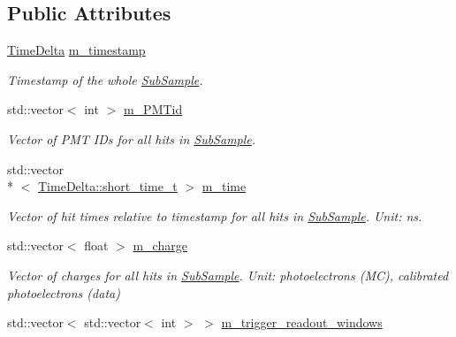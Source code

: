 \subsection*{Public Attributes}
\begin{DoxyCompactItemize}
\item 
\hypertarget{classSubSample_a72a6636299a7baca19c916b069a187f7}{\hyperlink{classTimeDelta}{Time\-Delta} \hyperlink{classSubSample_a72a6636299a7baca19c916b069a187f7}{m\-\_\-timestamp}}\label{classSubSample_a72a6636299a7baca19c916b069a187f7}

\begin{DoxyCompactList}\small\item\em Timestamp of the whole \hyperlink{classSubSample}{Sub\-Sample}. \end{DoxyCompactList}\item 
\hypertarget{classSubSample_adc85934cd222f1f74b99b2ef4963fc9a}{std\-::vector$<$ int $>$ \hyperlink{classSubSample_adc85934cd222f1f74b99b2ef4963fc9a}{m\-\_\-\-P\-M\-Tid}}\label{classSubSample_adc85934cd222f1f74b99b2ef4963fc9a}

\begin{DoxyCompactList}\small\item\em Vector of P\-M\-T I\-Ds for all hits in \hyperlink{classSubSample}{Sub\-Sample}. \end{DoxyCompactList}\item 
\hypertarget{classSubSample_add9e70423870598d31cd57084ecf13ad}{std\-::vector\\*
$<$ \hyperlink{classTimeDelta_afe4b7adde6a0645a8ada61f39e198c8e}{Time\-Delta\-::short\-\_\-time\-\_\-t} $>$ \hyperlink{classSubSample_add9e70423870598d31cd57084ecf13ad}{m\-\_\-time}}\label{classSubSample_add9e70423870598d31cd57084ecf13ad}

\begin{DoxyCompactList}\small\item\em Vector of hit times relative to timestamp for all hits in \hyperlink{classSubSample}{Sub\-Sample}. Unit\-: ns. \end{DoxyCompactList}\item 
\hypertarget{classSubSample_a997905ab2499c068d107f0ee7ac8b294}{std\-::vector$<$ float $>$ \hyperlink{classSubSample_a997905ab2499c068d107f0ee7ac8b294}{m\-\_\-charge}}\label{classSubSample_a997905ab2499c068d107f0ee7ac8b294}

\begin{DoxyCompactList}\small\item\em Vector of charges for all hits in \hyperlink{classSubSample}{Sub\-Sample}. Unit\-: photoelectrons (M\-C), calibrated photoelectrons (data) \end{DoxyCompactList}\item 
\hypertarget{classSubSample_adb0dbcc161e814ca568ca75f6edc871e}{std\-::vector$<$ std\-::vector$<$ int $>$ $>$ \hyperlink{classSubSample_adb0dbcc161e814ca568ca75f6edc871e}{m\-\_\-trigger\-\_\-readout\-\_\-windows}}\label{classSubSample_adb0dbcc161e814ca568ca75f6edc871e}


\end{DoxyCompactItemize}

